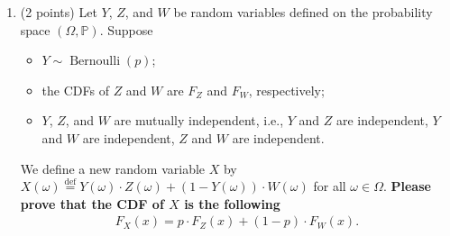 \documentclass[11pt]{article}
\newcommand{\1}{\mathbbm{1}}
\newcommand{\p}{\mathbb{P}}
\begin{document}
\begin{enumerate}
\begin{figure}
    \caption{The CDF of the distribution of $X$ defined in Eq.~\eqref{eq: example whose dist is neither conti nor disc}. This function is neither continuous nor piecewise constant/step-like.}
    \label{fig: example whose dist is neither conti nor disc}
\end{figure}

\textbf{Please prove the formula in Eq.~\eqref{eq: a fair mixture of 1 and N(0,1)}.}

\begin{proof}
    By the law of total probability, 
    \[F_X(x)=\p(X\leq x)=\p(X\leq x\mid Y=1)\cdot \p(Y=1)+\p(X\leq x\mid Y=0)\cdot \p(Y=0)\]
    We will now compute each half of the sum.
    \begin{align*}
        \p(X\leq x\mid Y=1)\cdot \p(Y=1) &= \p(Y+(1-Y)Z\leq x\mid Y=1)\cdot \p(Y=1)\\
        &= \p(1+(1-1)Z\leq x)\cdot \p(Y=1)\\
        &= \p(1\leq x)\cdot \p(Y=1)\\
        &= \frac{1}{2}\1_{[1,+\infty)}(x)
    \end{align*}
    \begin{align*}
        \p(X\leq x\mid Y=0)\cdot \p(Y=0) &= \p(Y+(1-Y)Z\leq x\mid Y=0)\cdot \p(Y=0)\\
        &= \p(0+(1-0)Z\leq x)\cdot \p(Y=0)\\
        &= \p(Z\leq x)\cdot \p(Y=0)\\
        &= \frac{1}{2}F_Z(x)
    \end{align*}
    Therefore, \(F_X(x)=\frac{1}{2}\1_{[1,+\infty)}(x)+\frac{1}{2}F_Z(x)\).
\end{proof}

\item (2 points) Let $Y$, $Z$, and $W$ be random variables defined on the probability space $(\Omega,\mathbb{P})$. Suppose
    \begin{itemize}
        \item $Y\sim\operatorname{Bernoulli}(p)$;
        \item the CDFs of $Z$ and $W$ are $F_Z$ and $F_W$, respectively;
        \item $Y$, $Z$, and $W$ are mutually independent, i.e., $Y$ and $Z$ are independent, $Y$ and $W$ are independent, $Z$ and $W$ are independent.
    \end{itemize} 
    We define a new random variable $X$ by $X(\omega)\overset{\operatorname{def}}{=} Y(\omega)\cdot Z(\omega) + (1-Y(\omega))\cdot W(\omega)$ for all $\omega\in\Omega$. \textbf{Please prove that the CDF of $X$ is the following}
    \begin{align*}
        F_X(x) = p\cdot F_Z(x)+(1-p)\cdot F_W(x).
    \end{align*}


\end{enumerate}
\end{document}
